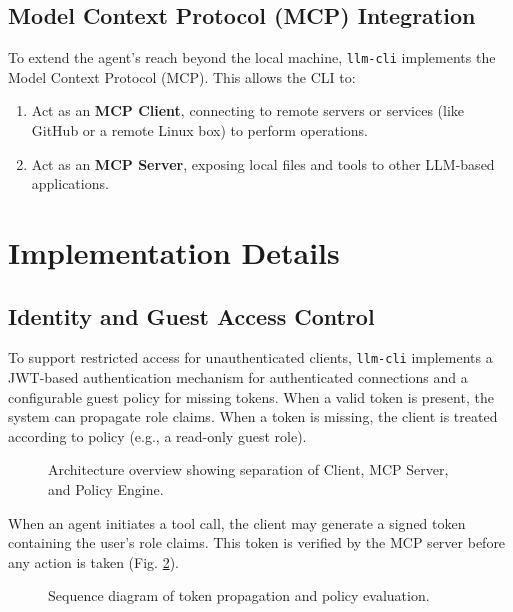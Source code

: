 \documentclass[conference]{IEEEtran}
\begin{document}
\subsection{Model Context Protocol (MCP) Integration}
To extend the agent's reach beyond the local machine, \texttt{llm-cli} implements the Model Context Protocol (MCP). This allows the CLI to:
\begin{enumerate}
    \item Act as an \textbf{MCP Client}, connecting to remote servers or services (like GitHub or a remote Linux box) to perform operations.
    \item Act as an \textbf{MCP Server}, exposing local files and tools to other LLM-based applications.
\end{enumerate}

\section{Implementation Details}

\subsection{Identity and Guest Access Control}
To support restricted access for unauthenticated clients, \texttt{llm-cli} implements a JWT-based authentication mechanism for authenticated connections and a configurable guest policy for missing tokens. When a valid token is present, the system can propagate role claims. When a token is missing, the client is treated according to policy (e.g., a read-only guest role).

\begin{figure}[htbp]
    \centering
    \resizebox{\linewidth}{!}{}
    \caption{Architecture overview showing separation of Client, MCP Server, and Policy Engine.}
    \label{fig:architecture}
\end{figure}

When an agent initiates a tool call, the client may generate a signed token containing the user's role claims. This token is verified by the MCP server before any action is taken (Fig. \ref{fig:sequence}).

\begin{figure}[htbp]
    \centering
    \resizebox{\linewidth}{!}{}
    \caption{Sequence diagram of token propagation and policy evaluation.}
    \label{fig:sequence}
\end{figure}
\end{document}
